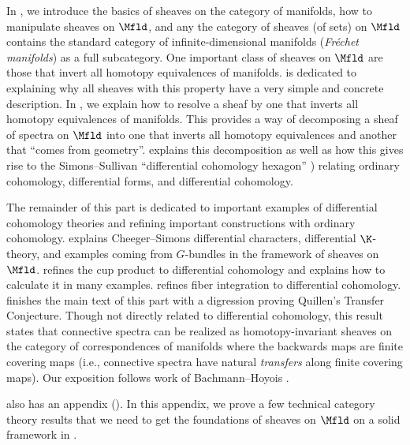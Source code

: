 In , we introduce the basics of sheaves on the category of manifolds, how to manipulate sheaves on $ \Mfld $, and any the category of sheaves (of sets) on $ \Mfld $ contains the standard category of infinite-dimensional manifolds (\textit{Fréchet manifolds}) as a full subcategory.
One important class of sheaves on $ \Mfld $ are those that invert all homotopy equivalences of manifolds.
 is dedicated to explaining why all sheaves with this property have a very simple and concrete description.
In , we explain how to resolve a sheaf by one that inverts all homotopy equivalences of manifolds.
This provides a way of decomposing a sheaf of spectra on $ \Mfld $ into one that inverts all homotopy equivalences
and another that ``comes from geometry''.
 explains this decomposition as well as how this gives rise to the Simons--Sullivan ``differential
cohomology hexagon'' \cite[\S1]{MR2365651}) relating ordinary cohomology, differential forms, and differential cohomology.

The remainder of this part is dedicated to important examples of differential cohomology theories and refining important constructions with ordinary cohomology.
 explains Cheeger--Simons differential characters, differential $ \K $-theory, and examples coming from $ G $-bundles in the framework of sheaves on $ \Mfld $.
 refines the cup product to differential cohomology and explains how to calculate it in many examples.
 refines fiber integration to differential cohomology.
 finishes the main text of this part with a digression proving Quillen's Transfer Conjecture.
Though not directly related to differential cohomology, this result states that connective spectra can be realized as homotopy-invariant sheaves on the category of correspondences of manifolds where the backwards maps are finite covering maps (i.e., connective spectra have natural \textit{transfers} along finite covering maps).
Our exposition follows work of Bachmann--Hoyois \cite[Appendix C]{MotivicNorms:BachmannHoyois}.

 also has an appendix ().
In this appendix, we prove a few technical category theory results that we need to get the foundations of sheaves on $ \Mfld $ on a solid framework in .


